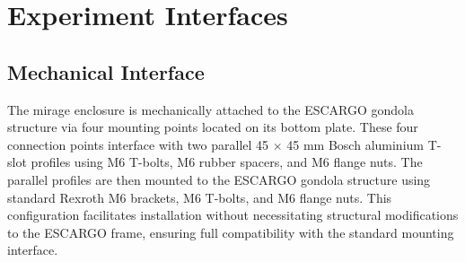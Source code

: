 
\section{Experiment Interfaces}

\subsection{Mechanical Interface}\label{mechanical_interface}

The \gls{mirage} enclosure is mechanically attached to the ESCARGO gondola structure via four mounting points located on its bottom plate. These four connection points interface with two parallel 45 $\times$ 45 mm Bosch aluminium T-slot profiles using M6 T-bolts, M6 rubber spacers, and M6 flange nuts. The parallel profiles are then mounted to the ESCARGO gondola structure using standard Rexroth M6 brackets, M6 T-bolts, and M6 flange nuts. This configuration facilitates installation without necessitating structural modifications to the ESCARGO frame, ensuring full compatibility with the standard mounting interface.

